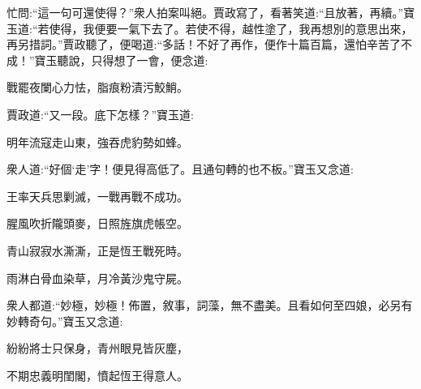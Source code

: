 \begin{parag}
    忙問:“這一句可還使得？”衆人拍案叫絕。賈政寫了，看著笑道:“且放著，再續。”寶玉道:“若使得，我便要一氣下去了。若使不得，越性塗了，我再想別的意思出來，再另措詞。”賈政聽了，便喝道:“多話！不好了再作，便作十篇百篇，還怕辛苦了不成！”寶玉聽說，只得想了一會，便念道:
\end{parag}


\begin{poem}
    \begin{pl}戰罷夜闌心力怯，脂痕粉漬污鮫鮹。\end{pl}
\end{poem}


\begin{parag}
    賈政道:“又一段。底下怎樣？”寶玉道:
\end{parag}


\begin{poem}
    \begin{pl}明年流寇走山東，強吞虎豹勢如蜂。\end{pl}
\end{poem}


\begin{parag}
    衆人道:“好個‘走’字！便見得高低了。且通句轉的也不板。”寶玉又念道:
\end{parag}


\begin{poem}
    \begin{pl}王率天兵思剿滅，一戰再戰不成功。\end{pl}

    \begin{pl}腥風吹折隴頭麥，日照旌旗虎帳空。\end{pl}

    \begin{pl}青山寂寂水澌澌，正是恆王戰死時。\end{pl}

    \begin{pl}雨淋白骨血染草，月冷黃沙鬼守屍。\end{pl}

\end{poem}


\begin{parag}
    衆人都道:“妙極，妙極！佈置，敘事，詞藻，無不盡美。且看如何至四娘，必另有妙轉奇句。”寶玉又念道:
\end{parag}


\begin{poem}
    \begin{pl}紛紛將士只保身，青州眼見皆灰塵，\end{pl}

    \begin{pl}不期忠義明閨閣，憤起恆王得意人。\end{pl}

\end{poem}


